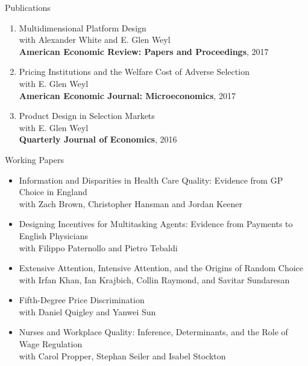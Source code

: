 \documentclass{resume}
\begin{document}
\begin{rSection}{Publications}
\begin{enumerate}
\item Multidimensional Platform Design\\ 
with Alexander White and E. Glen Weyl \\
\textbf{American Economic Review: Papers and Proceedings}, 2017

\item Pricing Institutions and the Welfare Cost of Adverse Selection\\
 with E. Glen Weyl \\
\textbf{American Economic Journal: Microeconomics}, 2017

\item Product Design in Selection Markets\\
 with E. Glen Weyl \\ 
\textbf{Quarterly Journal of Economics}, 2016
	
\end{enumerate}






\end{rSection}










\begin{rSection}{Working Papers}

\begin{itemize}
	\item Information and Disparities in Health Care Quality: Evidence from GP Choice in England \\ 
	with Zach Brown, Christopher Hansman and Jordan Keener

	\item Designing Incentives for Multitasking Agents: Evidence from Payments to English Physicians\\ 
	with Filippo Paternollo and Pietro Tebaldi
	
	\item Extensive Attention, Intensive Attention, and the Origins of Random Choice\\ 
	with Irfan Khan, Ian Krajbich, Collin Raymond, and Savitar Sundaresan
	
	\item Fifth-Degree Price Discrimination \\ 
	with Daniel Quigley and Yanwei Sun
	
	\item Nurses and Workplace Quality: Inference, Determinants, and the Role of Wage Regulation \\ 
	with Carol Propper, Stephan Seiler and Isabel Stockton


\end{itemize}




\end{rSection}
\end{document}

